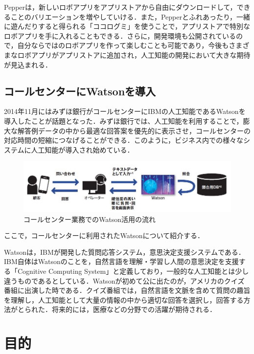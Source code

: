 Pepperは，新しいロボアプリをアプリストアから自由にダウンロードして，できることのバリエーションを増やしていける．また，Pepperとふれあったり，一緒に遊んだりすると得られる「ココログミ」を使うことで，アプリストアで特別なロボアプリを手に入れることもできる．さらに，開発環境も公開されているので，自分ならではのロボアプリを作って楽しむことも可能であり，今後もさまざまなロボアプリがアプリストアに追加され，人工知能の開発において大きな期待が見込まれる．

\clearpage


\section{コールセンターにWatsonを導入}

2014年11月にはみずほ銀行がコールセンターにIBMの人工知能であるWatsonを導入したことが話題となった．みずほ銀行では、人工知能を利用することで，膨大な解答例データの中から最適な回答案を優先的に表示させ，コールセンターの対応時間の短縮につなげることができる．このように，ビジネス内での様々なシステムに人工知能が導入され始めている\cite{mizuho2014}．

\begin{figure}[h]
\centering
\includegraphics[width=15cm]{watson.jpg}
\caption{コールセンター業務でのWatson活用の流れ}\label{図}
\end{figure}


ここで，コールセンターに利用されたWatsonについて紹介する\cite{watson}．

Watsonは，IBMが開発した質問応答システム，意思決定支援システムである．IBM自体はWatsonのことを，自然言語を理解・学習し人間の意思決定を支援する「Cognitive Computing System」と定義しており，一般的な人工知能とは少し違うものであるとしている．Watsonが初めて公に出たのが，アメリカのクイズ番組に出演した時である．クイズ番組では，自然言語を文脈を含めて質問の趣旨を理解し，人工知能として大量の情報の中から適切な回答を選択し，回答する方法がとられた．将来的には，医療などの分野での活躍が期待される．




\chapter{目的}

